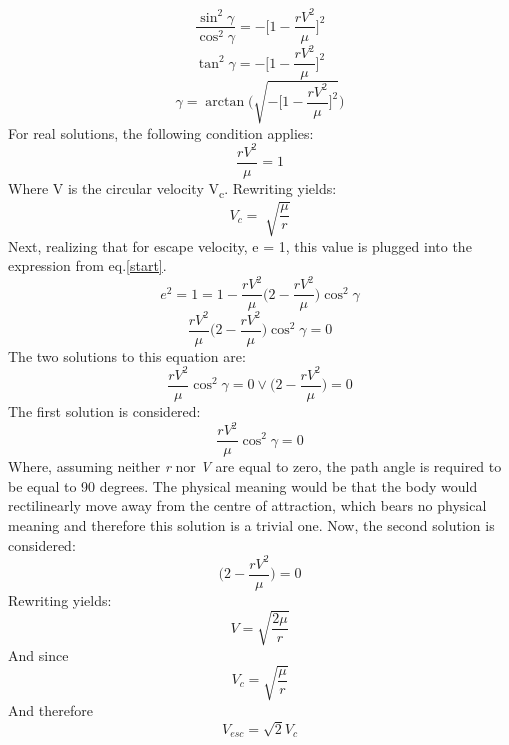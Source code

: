 \begin{equation}
\frac{\sin^2\gamma}{\cos^2\gamma} = - \Bigg[1-\frac{rV^2}{\mu}\Bigg]^2
\end{equation}
\begin{equation}
\tan^2\gamma = - \Bigg[1-\frac{rV^2}{\mu}\Bigg]^2
\end{equation}
\begin{equation}
\gamma = \arctan\Bigg(\sqrt{-\Big[1-\frac{rV^2}{\mu}\Big]^2}\Bigg)
\end{equation}
For real solutions, the following condition applies:
\begin{equation}
\frac{rV^2}{\mu} = 1
\end{equation}
Where V is the circular velocity V\textsubscript c. Rewriting yields:
\begin{equation}
V_c = \sqrt[]{\frac{\mu}{r}}
\end{equation}
Next, realizing that for escape velocity, e = 1, this value is plugged into the expression from eq.\ref{start}.
\begin{equation}
e^2 = 1 = 1 - \frac{r V^2}{\mu}\Bigg(2 - \frac{r V^2}{\mu}\Bigg) \cos^2 \gamma
\end{equation}
\begin{equation}
\frac{r V^2}{\mu}\Bigg(2 - \frac{r V^2}{\mu}\Bigg) \cos^2 \gamma = 0
\end{equation}
The two solutions to this equation are:
\begin{equation}
\frac{r V^2}{\mu}\cos^2 \gamma = 0 \lor \Bigg(2-\frac{rV^2}{\mu}\Bigg) = 0
\end{equation}
The first solution is considered:
\begin{equation}
\frac{r V^2}{\mu}\cos^2 \gamma = 0
\end{equation}
Where, assuming neither \textit{r} nor \textit{V} are equal to zero, the path angle is required to be equal to 90 degrees. The physical meaning would be that the body would rectilinearly move away from the centre of attraction, which bears no physical meaning and therefore this solution is a trivial one.
Now, the second solution is considered:
\begin{equation}
\Bigg(2-\frac{rV^2}{\mu}\Bigg) = 0
\end{equation}
Rewriting yields:
\begin{equation}
V = \sqrt{\frac{2\mu}{r}}
\end{equation}
And since
\begin{equation}
V_c = \sqrt{\frac{\mu}{r}}
\end{equation}
And therefore
\begin{equation}
V_{esc} = \sqrt{2} V_c
\end{equation}
